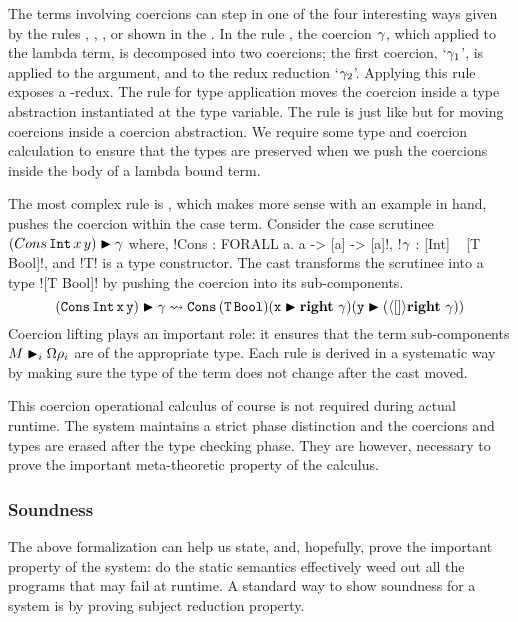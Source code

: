 \documentclass[screen,nonacm]{acmart}
\begin{document}
The terms involving coercions can step in one of the four interesting
ways given by the rules , , ,
or  shown in the . In the rule
, the coercion $\gamma$, which applied to the lambda term, is
decomposed into two coercions; the first coercion, `$\gamma_1$', is
applied to the argument, and to the redux reduction
`$\gamma_2$'. Applying this rule exposes a \trule{$\beta$}-redux. The
rule  for type application
moves the coercion inside a type abstraction instantiated at the type
variable. The rule  is just like  but for
moving coercions inside a coercion abstraction. We require some type
and coercion calculation to ensure that the types are preserved when
we push the coercions inside the body of a lambda bound term.

The most complex rule is , which makes more sense with an
example in hand, pushes the coercion within the case term. Consider
the case scrutinee $(Cons\, \texttt{Int}\, x\, y)\mathrel{\blacktriangleright}\gamma$
where, !Cons : FORALL a. a -> [a] -> [a]!,
!$\gamma$ : [Int] ~ [T Bool]!, and !T! is a type constructor.
The cast transforms the scrutinee into a type ![T Bool]! by pushing
the coercion into its sub-components.
\[
(\texttt{Cons}\, \texttt{Int}\, \texttt{x}\,
    \texttt{y})\mathrel{\blacktriangleright}\gamma \rightsquigarrow \texttt{Cons} \, (\texttt{T}\,
  \texttt{Bool}) (\texttt{x}\mathrel{\blacktriangleright}\textbf{right}~\gamma) (\texttt{y}\mathrel{\blacktriangleright}(\langle{[]}\rangle\textbf{right}~\gamma))
\]
Coercion lifting plays an important role: it ensures that the
term sub-components $M\mathrel{\blacktriangleright}_i {\Omega}\rho_i$ are of the appropriate
type. Each rule is derived in a systematic way by making sure the type
of the term does not change after the cast moved.

This coercion operational calculus of course is not required during
actual runtime. The system maintains a strict phase distinction and
the coercions and types are erased after the type checking phase. They
are however, necessary to prove the important meta-theoretic property
of the calculus.

\subsubsection{Soundness}
The above formalization can help us state, and, hopefully, prove
the important property of the system: do the static semantics
effectively weed out all the programs that may fail at runtime.
A standard way to show soundness for a system is by proving subject
reduction property\cite{wright_syntactic_1994}.
\end{document}
